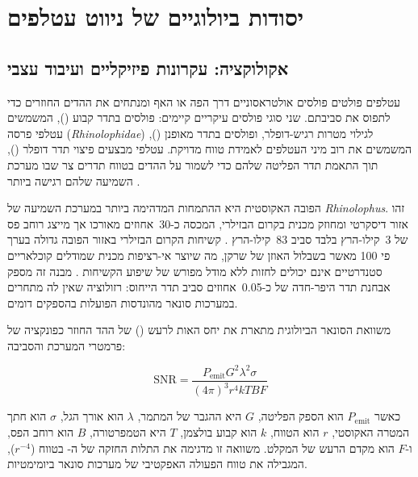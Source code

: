 

\section{יסודות ביולוגיים של ניווט עטלפים}
\label{sec:bio_basis}

\subsection{אקולוקציה: עקרונות פיזיקליים ועיבוד עצבי}
\label{sec:echolocation_physics}

עטלפים פולטים פולסים אולטראסוניים דרך הפה או האף ומנתחים את ההדים החוזרים כדי לתפוס את סביבתם. שני סוגי פולסים עיקריים קיימים: פולסים בתדר קבוע (), המשמשים עטלפי פרסה (\textit{Rhinolophidae}) לגילוי מטרות רגיש-דופלר, ופולסים בתדר מאופנן (), המשמשים את רוב מיני העטלפים לאמידת טווח מדויקת. עטלפי  מבצעים פיצוי תדר דופלר (), תוך התאמת תדר הפליטה שלהם כדי לשמור על ההדים בטווח תדרים צר שבו מערכת השמיעה שלהם רגישה ביותר \cite{Schuller1974DSC}.

הפובה האקוסטית היא ההתמחות המדהימה ביותר במערכת השמיעה של \textit{Rhinolophus}. זהו אזור דיסקרטי ומחוזק מכנית בקרום הבזילרי, המכסה כ-30~אחוזים מאורכו אך מייצג רוחב פס של 3~קילו-הרץ בלבד סביב 83~קילו-הרץ \cite{Schnitzler1968DSC}. קשיחות הקרום הבזילרי באזור הפובה גדולה בערך פי 100 מאשר בשבלול האוזן של שרקן, מה שיוצר אי-רציפות מכנית שמודלים קוכלאריים סטנדרטיים אינם יכולים לחזות ללא מודל מפורש של שיפוע הקשיחות \cite{GriffinBatEcholocation}. מבנה זה מספק אבחנת תדר היפר-חדה של כ-0.05~אחוזים סביב תדר הייחוס: רזולוציה שאין לה מתחרים במערכות סונאר מהונדסות הפועלות בהספקים דומים.

משוואת הסונאר הביולוגית מתארת את יחס האות לרעש () של ההד החוזר כפונקציה של פרמטרי המערכת והסביבה:

\begin{equation}
\text{SNR} = \frac{P_{\text{emit}} G^2 \lambda^2 \sigma}{(4\pi)^3 r^4 k T B F}
\label{eq:ch02_sonar_eq}
\end{equation}

כאשר $P_{\text{emit}}$ הוא הספק הפליטה, $G$ היא ההגבר של המתמר, $\lambda$ הוא אורך הגל, $\sigma$ הוא חתך המטרה האקוסטי, $r$ הוא הטווח, $k$ הוא קבוע בולצמן, $T$ היא הטמפרטורה, $B$ הוא רוחב הפס, ו-$F$ הוא מקדם הרעש של המקלט. משוואה זו מדגימה את התלות החזקה של ה- בטווח ($r^{-4}$), המגבילה את טווח הפעולה האפקטיבי של מערכות סונאר ביומימטיות.

